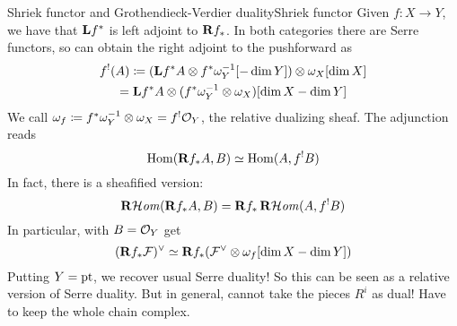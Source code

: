 \begin{example}{Shriek functor and Grothendieck-Verdier duality}{Shriek functor}
Given $f:X\to Y$, we have that $\mathbf{L} f^*$ is left adjoint to $\mathbf{R} f_*$. In both categories there are Serre functors, so can obtain the right adjoint to the pushforward as
\begin{gather*}
    f^!(A) \coloneqq (\mathbf{L} f^*A\otimes f^*\omega_Y^{-1}[-\dim Y])
            \otimes \omega_X[\dim X] \\
        = \mathbf{L} f^*A\otimes(f^*\omega_Y^{-1}\otimes\omega_X)[\dim X -\dim Y]
\end{gather*}
We call $\omega_f\coloneqq f^*\omega_Y^{-1}\otimes\omega_X=f^!\mathcal{O}_Y$, the relative dualizing sheaf. The adjunction reads
\begin{equation*}
    \operatorname{Hom}(\mathbf{R} f_*A,B)\simeq \operatorname{Hom}(A,f^!B)
\end{equation*}
In fact, there is a sheafified version:
\begin{equation*}
    \operatorname{\mathbf{R}\mathcal{H}\mathit{om}}(\mathbf{R} f_*A,B)=\mathbf{R} f_*\operatorname{\mathbf{R}\mathcal{H}\mathit{om}}(A,f^!B)
\end{equation*}
In particular, with $B=\mathcal{O}_Y$ get
\begin{equation*}
    (\mathbf{R} f_*\mathcal{F})^\vee
        \simeq \mathbf{R} f_*(\mathcal{F}^\vee\otimes\omega_f[\dim X-\dim Y])
\end{equation*}
Putting $Y=\mathrm{pt}$, we recover usual Serre duality! So this can be seen as a relative version of Serre duality. But in general, cannot take the pieces $R^i$ as dual! Have to keep the whole chain complex.
\end{example}



